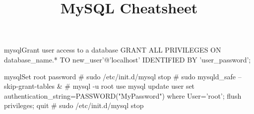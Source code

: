 \documentclass[10pt,a4paper]{article}
\title{\color{w3schools}MySQL Cheatsheet
}
\begin{document}
\maketitle

\small
\begin{multicols}{3}

\thispagestyle{empty}
\scriptsize



\begin{codebox}{mysql}{Grant user access to a database}
GRANT ALL PRIVILEGES ON database_name.* TO new_user'@'localhost' IDENTIFIED BY 'user_password';

\end{codebox}

\begin{codebox}{mysql}{Set root password}
# sudo /etc/init.d/mysql stop
# sudo mysqld_safe --skip-grant-tables &
# mysql -u root
  use mysql
  update user set authentication_string=PASSWORD("MyPassword") where User='root';
  flush privileges;
  quit
# sudo /etc/init.d/mysql stop

\end{codebox}


\AtNextBibliography{\footnotesize}
\printbibliography  
\end{multicols}
\end{document}
